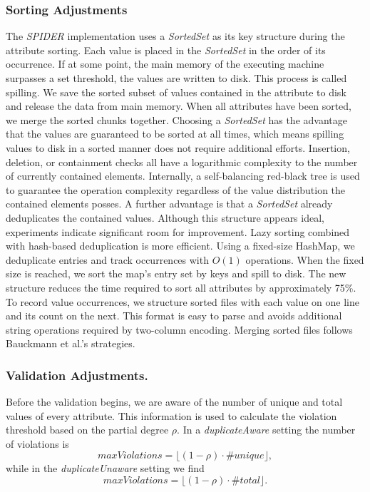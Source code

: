 \subsubsection{\textbf{Sorting Adjustments}}
The \textit{SPIDER} implementation uses a \textit{SortedSet} as its key structure during the attribute sorting. Each value is placed in the \textit{SortedSet} in the order of its occurrence. If at some point, the main memory of the executing machine surpasses a set threshold, the values are written to disk. This process is called spilling. We save the sorted subset of values contained in the attribute to disk and release the data from main memory. When all attributes have been sorted, we merge the sorted chunks together. Choosing a \textit{SortedSet} has the advantage that the values are guaranteed to be sorted at all times, which means spilling values to disk in a sorted manner does not require additional efforts. Insertion, deletion, or containment checks all have a logarithmic complexity to the number of currently contained elements. Internally, a self-balancing red-black tree is used to guarantee the operation complexity regardless of the value distribution the contained elements posses. A further advantage is that a \textit{SortedSet} already deduplicates the contained values. Although this structure appears ideal, experiments indicate significant room for improvement. Lazy sorting combined with hash-based deduplication is more efficient. Using a fixed-size HashMap, we deduplicate entries and track occurrences with $O(1)$ operations. When the fixed size is reached, we sort the map's entry set by keys and spill to disk. The new structure reduces the time required to sort all attributes by approximately 75\%. To record value occurrences, we structure sorted files with each value on one line and its count on the next. This format is easy to parse and avoids additional string operations required by two-column encoding. Merging sorted files follows Bauckmann et al.'s strategies.

\subsubsection{\textbf{Validation Adjustments.}}
Before the validation begins, we are aware of the number of unique and total values of every attribute. This information is used to calculate the violation threshold based on the partial degree $\rho$. In a \textit{duplicateAware} setting the number of violations is
$$
\textit{maxViolations} = \lfloor (1 - \rho) \cdot \# unique \rfloor,
$$
while in the \textit{duplicateUnaware} setting we find
$$
\textit{maxViolations} = \lfloor (1 - \rho) \cdot \# total \rfloor.
$$

